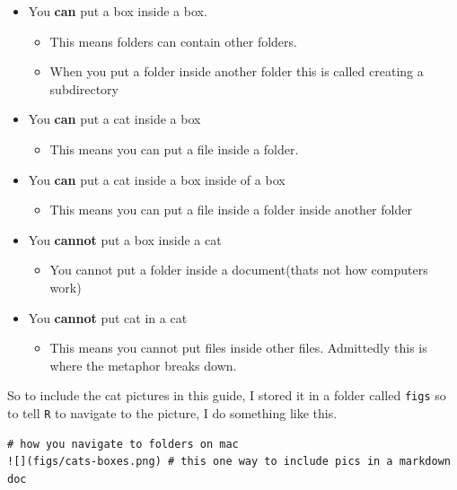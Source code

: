 \documentclass[
  letterpaper,
  DIV=11,
  numbers=noendperiod,
  oneside]{scrreprt}
\providecommand{\tightlist}{%
  \setlength{\itemsep}{0pt}\setlength{\parskip}{0pt}}\usepackage{longtable,booktabs,array}
\begin{document}
\begin{itemize}
\tightlist
\item
  You \textbf{can} put a box inside a box.

  \begin{itemize}
  \tightlist
  \item
    This means folders can contain other folders.
  \item
    When you put a folder inside another folder this is called creating
    a subdirectory
  \end{itemize}
\item
  You \textbf{can} put a cat inside a box

  \begin{itemize}
  \tightlist
  \item
    This means you can put a file inside a folder.
  \end{itemize}
\item
  You \textbf{can} put a cat inside a box inside of a box

  \begin{itemize}
  \tightlist
  \item
    This means you can put a file inside a folder inside another folder
  \end{itemize}
\item
  You \textbf{cannot} put a box inside a cat

  \begin{itemize}
  \tightlist
  \item
    You cannot put a folder inside a document(thats not how computers
    work)
  \end{itemize}
\item
  You \textbf{cannot} put cat in a cat

  \begin{itemize}
  \tightlist
  \item
    This means you cannot put files inside other files. Admittedly this
    is where the metaphor breaks down.
  \end{itemize}
\end{itemize}

So to include the cat pictures in this guide, I stored it in a folder
called \texttt{figs} so to tell \texttt{R} to navigate to the picture, I
do something like this.

\begin{verbatim}
# how you navigate to folders on mac
![](figs/cats-boxes.png) # this one way to include pics in a markdown doc
\end{verbatim}
\end{document}
